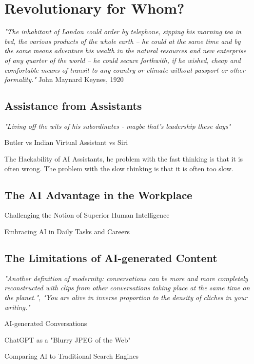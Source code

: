 \setchapterpreamble[u]{\margintoc}
\chapter{Revolutionary for Whom?}

\textit{"The inhabitant of London could order by telephone, sipping his morning tea in bed, the various products of the whole earth -- he could at the same time and by the same means adventure his wealth in the natural resources and new enterprise of any quarter of the world -- he could secure forthwith, if he wished, cheap and comfortable means of transit to any country or climate without passport or other formality."} John Maynard Keynes, 1920 \cite{Keynes2012}

\section{Assistance from Assistants}

\textit{"Living off the wits of his subordinates - maybe that's leadership these days"}\cite{Lecarre}

Butler vs Indian Virtual Assistant vs Siri

The Hackability of AI Assistants, he problem with the fast thinking is that it is often wrong. The problem with the slow thinking is that it is often too slow.

\section{The AI Advantage in the Workplace}
Challenging the Notion of Superior Human Intelligence

Embracing AI in Daily Tasks and Careers

\section{The Limitations of AI-generated Content}

\textit{"Another definition of modernity: conversations can be more and more completely reconstructed with clips from other conversations taking place at the same time on the planet.", "You are alive in inverse proportion to the density of cliches in your writing."}\cite{procrustes} 

AI-generated Conversations

ChatGPT as a "Blurry JPEG of the Web" \cite{newyorkerChatGPTBlurry}

Comparing AI to Traditional Search Engines

